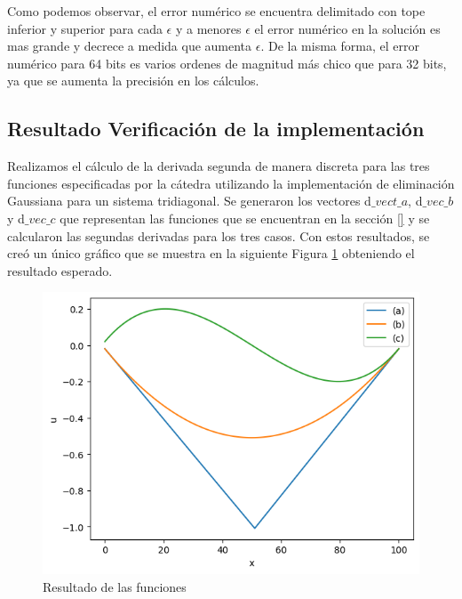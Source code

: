 Como podemos observar, el error numérico se encuentra delimitado con tope inferior y superior para cada $\epsilon$ y a menores $\epsilon$ el error numérico en la solución es mas grande y decrece a medida que aumenta $\epsilon$. De la misma forma, el error numérico para 64 bits es varios ordenes de magnitud más chico que para 32 bits, ya que se aumenta la precisión en los cálculos.

\subsection{Resultado Verificación de la implementación}
\label{resultados derivada}
Realizamos el cálculo de la derivada segunda de manera discreta para las tres funciones especificadas por la cátedra utilizando la implementación de eliminación Gaussiana para un sistema tridiagonal.
Se generaron los vectores d$\_vect\_a$, d$\_vec\_b$  y d$\_vec\_c$ que representan las funciones que se encuentran en la sección \ref{} y se calcularon las segundas derivadas para los tres casos.
Con estos resultados, se creó un único gráfico que se muestra en la siguiente Figura \ref{result_laplaciano} obteniendo el resultado esperado.

\begin{figure}[H]
\centerline{\includegraphics[scale=0.45]{./img/resultado_tridiag}}
\caption{Resultado de las funciones}
\label{result_laplaciano}
\end{figure}

